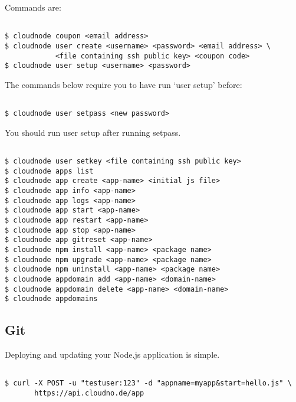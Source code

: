 Commands are:

\begin{adjustwidth}{2.5em}{2.5em}
\begin{verbatim}

$ cloudnode coupon <email address>
$ cloudnode user create <username> <password> <email address> \
            <file containing ssh public key> <coupon code>
$ cloudnode user setup <username> <password>

\end{verbatim}
\end{adjustwidth}

The commands below require you to have run `user setup' before:

\begin{adjustwidth}{2.5em}{2.5em}
\begin{verbatim}

$ cloudnode user setpass <new password>

\end{verbatim}
\end{adjustwidth}

You should run user setup after running setpass.

\begin{adjustwidth}{2.5em}{2.5em}
\begin{verbatim}

$ cloudnode user setkey <file containing ssh public key>
$ cloudnode apps list
$ cloudnode app create <app-name> <initial js file>
$ cloudnode app info <app-name>
$ cloudnode app logs <app-name>
$ cloudnode app start <app-name>
$ cloudnode app restart <app-name>
$ cloudnode app stop <app-name>
$ cloudnode app gitreset <app-name>
$ cloudnode npm install <app-name> <package name>
$ cloudnode npm upgrade <app-name> <package name>
$ cloudnode npm uninstall <app-name> <package name>
$ cloudnode appdomain add <app-name> <domain-name>
$ cloudnode appdomain delete <app-name> <domain-name>
$ cloudnode appdomains

\end{verbatim}
\end{adjustwidth}



\subsection{Git}
\label{git}

Deploying and updating your Node.js application is simple.

\begin{adjustwidth}{2.5em}{2.5em}
\begin{verbatim}

$ curl -X POST -u "testuser:123" -d "appname=myapp&start=hello.js" \
       https://api.cloudno.de/app

\end{verbatim}
\end{adjustwidth}

